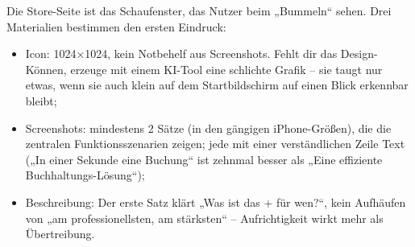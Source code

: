 
Die Store-Seite ist das Schaufenster, das Nutzer beim „Bummeln“ sehen. Drei Materialien bestimmen den ersten Eindruck:

\begin{itemize}
  \item Icon: 1024×1024, kein Notbehelf aus Screenshots. Fehlt dir das Design-Können, erzeuge mit einem KI-Tool eine schlichte Grafik – sie taugt nur etwas, wenn sie auch klein auf dem Startbildschirm auf einen Blick erkennbar bleibt;
  \item Screenshots: mindestens 2 Sätze (in den gängigen iPhone-Größen), die die zentralen Funktionsszenarien zeigen; jede mit einer verständlichen Zeile Text („In einer Sekunde eine Buchung“ ist zehnmal besser als „Eine effiziente Buchhaltungs-Lösung“);
  \item Beschreibung: Der erste Satz klärt „Was ist das + für wen?“, kein Aufhäufen von „am professionellsten, am stärksten“ – Aufrichtigkeit wirkt mehr als Übertreibung.
\end{itemize}

